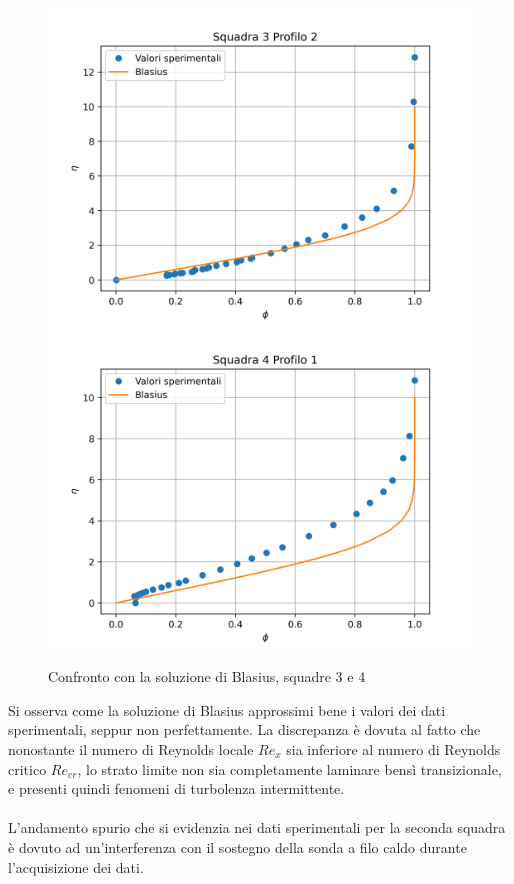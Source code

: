 \begin{figure}[H]
    \centering
    \includegraphics[width=.49\textwidth]{images/9/sq3p2_blasius.png}
    \includegraphics[width=.49\textwidth]{images/9/sq4p1_blasius.png}
    \caption{Confronto con la soluzione di Blasius, squadre 3 e 4}
\end{figure}

\noindent Si osserva come la soluzione di Blasius approssimi bene i valori dei dati sperimentali, seppur non perfettamente. La discrepanza è dovuta al fatto che nonostante il numero di Reynolds locale $Re_x$ sia inferiore al numero di Reynolds critico $Re_{cr}$, lo strato limite non sia completamente laminare bensì transizionale, e presenti quindi fenomeni di turbolenza intermittente.\\\\
L'andamento spurio che si evidenzia nei dati sperimentali per la seconda squadra è dovuto ad un'interferenza con il sostegno della sonda a filo caldo durante l'acquisizione dei dati.






